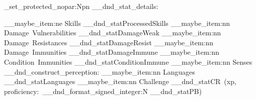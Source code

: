 \cs_set_protected_nopar:Npn \__dnd_stat_details:
{
	\begin {description}[
		before   = \color {StatblockHeading},
		font     = \RpgFontStatBlockBody\color {StatblockHeading},
		labelsep = \__rpg_SpaceDim,
		nosep]

	\__maybe_item:ne {Skills}					{\__dnd_statProcessedSkills} %
	\__maybe_item:nn {Damage~Vulnerabilities}	{\__dnd_statDamageWeak}
	\__maybe_item:nn {Damage~Resistances}		{\__dnd_statDamageResist}
	\__maybe_item:nn {Damage~Immunities}		{\__dnd_statDamageImmune}
	\__maybe_item:nn {Condition~Immunities}		{\__dnd_statConditionImmune}
	\__maybe_item:nn {Senses}					{\__dnd_construct_perception:}
	\__maybe_item:nn {Languages}				{\__dnd_statLanguages}
	\__maybe_item:nn {Challenge}				{\__dnd_statCR{}~(xp,~ proficiency:~\__dnd_format_signed_integer:N {\__dnd_statPB})}
	\end {description}
}

\DeclareDocumentCommand {\RpgStatLine} {}
{
	\par \vspace{-2pt} \noindent
	\par
}

